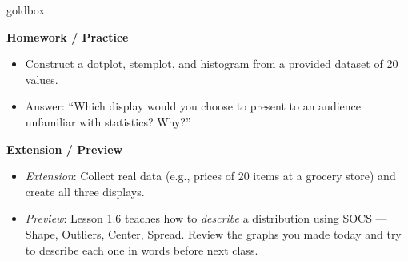 \documentclass[10pt]{article}
\begin{document}
\begin{skillbox}{goldbox}
\begin{minipage}[t]{0.48\linewidth}
    \textbf{Homework / Practice}
    \begin{itemize}
        \item Construct a dotplot, stemplot, and histogram from a provided dataset of 20 values.
        \item Answer: ``Which display would you choose to present to an audience unfamiliar with statistics? Why?''
    \end{itemize}
\end{minipage}
\hfill
\begin{minipage}[t]{0.48\linewidth}
    \textbf{Extension / Preview}
    \begin{itemize}
        \item \textit{Extension}: Collect real data (e.g., prices of 20 items at a grocery store) and create all three displays.
        \item \textit{Preview}: Lesson 1.6 teaches how to \textit{describe} a distribution using SOCS --- Shape, Outliers, Center, Spread. Review the graphs you made today and try to describe each one in words before next class.
    \end{itemize}
\end{minipage}
\end{skillbox}
\end{document}
